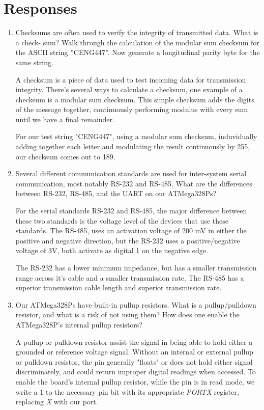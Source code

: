 \documentclass[letterpaper,11pt]{texMemo} %
\begin{document}
\section*{Responses}
\begin{enumerate}
    \item Checksums are often used to verify the integrity of transmitted data. What is a check-
sum? Walk through the calculation of the modular sum checksum for the ASCII string
”CENG447”. Now generate a longitudinal parity byte for the same string.
 
    A checksum is a piece of data used to test incoming data for transmission 
integrity. There's several ways to calculate a checksum, one example of a checksum is a 
modular sum checksum. This simple checksum adds the digits of the message together, continuously
performing modulus with every sum until we have a final remainder.

    For our test string "CENG447", using a modular sum checksum, induvidually
adding together each letter and modulating the result continuously by 255, our checksum comes out
to 189.

    \item Several different communication standards are used for inter-system serial communication,
most notably RS-232 and RS-485. What are the differences between RS-232, RS-485, and the
UART on our ATMega328Ps?

    For the serial standards RS-232 and RS-485, the major difference between these two standards is
the voltage level of the devices that use these standards. The RS-485, uses an activation voltage of
200 mV in either the positive and negative direction, but the RS-232 uses a positive/negative voltage
of 3V, both activate as digital 1 on the negative edge.

    The RS-232 has a lower minimum impedance, but has a smaller transmission range across it's cable
and a smaller transmission rate. The RS-485 has a superior transmission cable length and superior
transmission rate.

    \item Our ATMega328Ps have built-in pullup resistors. What is a pullup/pulldown resistor, and
what is a risk of not using them? How does one enable the ATMega328P’s internal pullup
resistors?

    A pullup or pulldown resistor assist the signal in being able to hold either a grounded or
reference voltage signal. Without an internal or external pullup or pulldown resistor, the pin
generally "floats" or does not hold either signal discriminately, and could return improper
digital readings when accessed. To enable the board's internal pullup resistor, while the pin
is in read mode, we write a 1 to the necessary pin bit with its appropriate \textit{PORTX} 
register, replacing \textit{X} with our port.

\end{enumerate}
\end{document}
